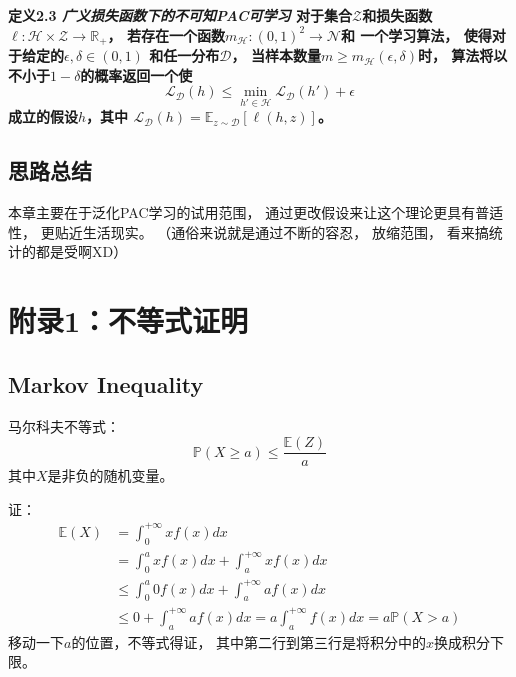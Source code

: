 \documentclass[UTF8]{ctexart}
\begin{document}
\textbf{
定义2.3 
\textit{广义损失函数下的不可知PAC可学习}
对于集合$\mathcal{Z}$和损失函数
$\ell:\mathcal{H}\times\mathcal{Z}\rightarrow\mathbb{R}_{+}$，
若存在一个函数$m_{\mathcal{H}}:{(0,1)}^2\rightarrow\mathcal{N}$和
一个学习算法，
使得对于给定的$\epsilon,\delta\in(0,1)$
和任一分布$\mathcal{D}$，
当样本数量$m\geq m_{\mathcal{H}}(\epsilon,\delta)$时，
算法将以不小于$1-\delta$的概率返回一个使
$$
\mathcal{L}_{\mathcal{D}}(h)\leq
\min_{h'\in\mathcal{H}}\mathcal{L}_{\mathcal{D}}(h')+\epsilon
$$
成立的假设$h$，其中
$\mathcal{L}_{\mathcal{D}}(h)=\mathbb{E}_{z\sim\mathcal{D}}[\ell(h,z)]$。
}

\subsection{思路总结}
本章主要在于泛化PAC学习的试用范围，
通过更改假设来让这个理论更具有普适性，
更贴近生活现实。
（通俗来说就是通过不断的容忍，
放缩范围，
看来搞统计的都是受啊XD）


\section{附录1：不等式证明}
\subsection{Markov Inequality}
马尔科夫不等式：
$$
\mathbb{P}(X\geq a)\leq \frac{\mathbb{E}(Z)}{a}
$$
其中$X$是非负的随机变量。

证：
$$
\begin{aligned}
\mathbb{E}(X) &=  \int_0^{+\infty}{xf(x)dx} \\
	&= \int_0^{a}{xf(x)dx} + \int_a^{+\infty}{xf(x)dx} \\
	&\leq 
	\int_0^{a}{0f(x)dx} + \int_a^{+\infty}{af(x)dx}\\
	&\leq 0 + \int_a^{+\infty}{af(x)dx} 
   = a\int_a^{+\infty}{f(x)dx} = a\mathbb{P}(X>a)
\end{aligned}
$$
移动一下$a$的位置，不等式得证，
其中第二行到第三行是将积分中的$x$换成积分下限。
\end{document}
